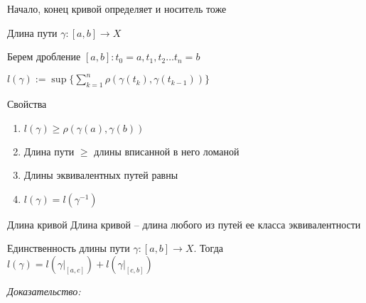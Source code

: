 \documentclass[12pt]{article}
\begin{document}
\begin{Remark}{}
    Начало, конец кривой определяет и носитель тоже
\end{Remark}

\begin{defin}{Длина пути}
    $\gamma : [a, b] \to X$

    Берем дробление $[a, b] : t_0 = a, t_1, t_2 \ldots t_n = b$

    $l(\gamma) := \sup \{ \sum\limits_{k = 1}^n \rho(\gamma(t_k), \gamma(t_{k - 1})) \}$
\end{defin}

\begin{theo}{Свойства}
    \begin{enumerate}
        \item $l(\gamma) \geq \rho(\gamma(a), \gamma(b))$
        \item Длина пути $\geq$ длины вписанной в него ломаной
        \item Длины эквивалентных путей равны 
        \item $l(\gamma) = l(\gamma^{-1})$
    \end{enumerate}
\end{theo}

\begin{defin}{Длина кривой}
    Длина кривой -- длина любого из путей ее класса эквивалентности 
\end{defin}

\begin{theo}{Единственность длины пути}
    $\gamma : [a, b] \to X$. Тогда $l(\gamma) = l(\gamma|_{[a, c]}) + l(\gamma|_{[c, b]})$
\end{theo}

\textit{Доказательство:}
\end{document}
